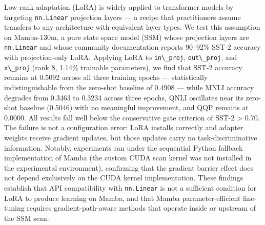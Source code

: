 
Low-rank adaptation (LoRA) is widely applied to transformer models by targeting \texttt{nn.Linear} projection layers --- a recipe that practitioners assume transfers to any architecture with equivalent layer types. We test this assumption on Mamba-130m, a pure state space model (SSM) whose projection layers are \texttt{nn.Linear} and whose community documentation reports 90--92\% SST-2 accuracy with projection-only LoRA. Applying LoRA to \texttt{in\textbackslash \_proj}, \texttt{out\textbackslash \_proj}, and \texttt{x\textbackslash \_proj} (rank 8, 1.14\% trainable parameters), we find that SST-2 accuracy remains at 0.5092 across all three training epochs --- statistically indistinguishable from the zero-shot baseline of 0.4908 --- while MNLI accuracy degrades from 0.3463 to 0.3234 across three epochs, QNLI oscillates near its zero-shot baseline (0.5046) with no meaningful improvement, and QQP remains at 0.0000. All results fall well below the conservative gate criterion of SST-2 > 0.70. The failure is not a configuration error: LoRA installs correctly and adapter weights receive gradient updates, but those updates carry no task-discriminative information. Notably, experiments ran under the sequential Python fallback implementation of Mamba (the custom CUDA scan kernel was not installed in the experimental environment), confirming that the gradient barrier effect does not depend exclusively on the CUDA kernel implementation. These findings establish that API compatibility with \texttt{nn.Linear} is not a sufficient condition for LoRA to produce learning on Mamba, and that Mamba parameter-efficient fine-tuning requires gradient-path-aware methods that operate inside or upstream of the SSM scan.

